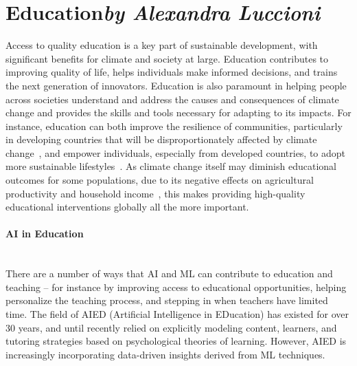 \documentclass[11pt]{report}
\newcommand{\Gap}{\texorpdfstring{\hfill}{}}
\newcommand{\Longterm}{\texorpdfstring{{\small\emph{\color{OliveGreen}{\fbox{Long-term}}}}}{}}
\begin{document}
\section{Education\texorpdfstring{\hfill\textit{by Alexandra Luccioni}}{}}
\label{sec:education}

Access to quality education is a key part of sustainable development, with significant benefits for climate and society at large. Education contributes to improving quality of life, helps individuals make informed decisions, and trains the next generation of innovators. Education is also paramount in helping people across societies understand and address the causes and consequences of climate change and provides the skills and tools necessary for adapting to its impacts. For instance, education can both improve the resilience of communities, particularly in developing countries that will be disproportionately affected by climate change~\cite{unesco2015}, and empower individuals, especially from developed countries, to adopt more sustainable lifestyles~\cite{fisher2016}. As climate change itself may diminish educational outcomes for some populations, due to its negative effects on agricultural productivity and household income~\cite{randell2016, randell2019}, this makes providing high-quality educational interventions globally all the more important.

\paragraph*{AI in Education}\Gap\textbf{\Longterm}\label{sec:aied}\mbox{}\\There are a number of ways that AI and ML can contribute to education and teaching -- for instance by improving access to educational opportunities, helping personalize the teaching process, and stepping in when teachers have limited time.
The field of AIED (Artificial Intelligence in EDucation) has existed for over 30 years, and until recently relied on explicitly modeling content, learners, and tutoring strategies based on psychological theories of learning.
However, AIED is increasingly incorporating data-driven insights derived from ML techniques.
\end{document}

